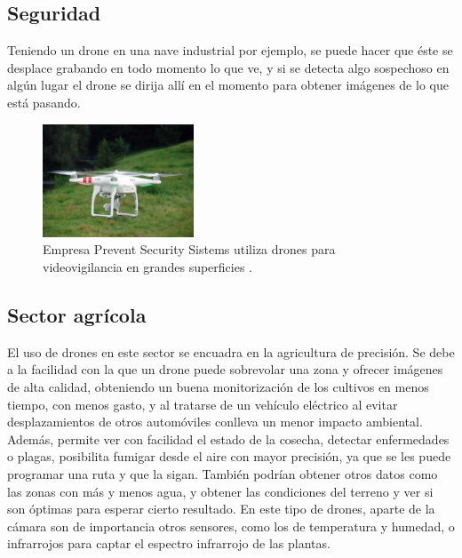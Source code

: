 \subsection{Seguridad} 
\hspace{1 cm}Teniendo un drone en una nave industrial por ejemplo, se puede hacer que \'este se desplace grabando en todo momento lo que ve, y si se detecta algo sospechoso en alg\'un lugar el drone se dirija all\'i en el momento para obtener im\'agenes de lo que est\'a pasando. 

\begin{figure}[H]
	\centering
		\includegraphics[width=0.4\textwidth]{imgs/seguridad_drone.jpg}
		\caption{Empresa Prevent Security Sistems utiliza drones para videovigilancia en grandes superficies .}
	\label{fig: Empresa Prevent Security Sistems realiza videovigilancia con drones.}
\end{figure}

	\subsection{Sector agr\'icola} 
\hspace{1 cm}El uso de drones en este sector se encuadra en la agricultura de precisi\'on. Se debe a la facilidad con la que un drone puede sobrevolar una zona y ofrecer im\'agenes de alta calidad, obteniendo un buena monitorizaci\'on de los cultivos en menos tiempo, con menos gasto, y al tratarse de un veh\'iculo el\'ectrico al evitar desplazamientos de otros autom\'oviles conlleva un menor impacto ambiental. Adem\'as, permite ver con facilidad el estado de la cosecha, detectar enfermedades o plagas, posibilita fumigar desde el aire con mayor precisi\'on, ya que se les puede programar una ruta y que la sigan. Tambi\'en podr\'ian obtener otros datos como las zonas con m\'as y menos agua, y obtener las condiciones del terreno y ver si son \'optimas para esperar cierto resultado. En este tipo de drones, aparte de la c\'amara son de importancia otros sensores, como los de temperatura y humedad, o infrarrojos para captar el espectro infrarrojo de las plantas. 

